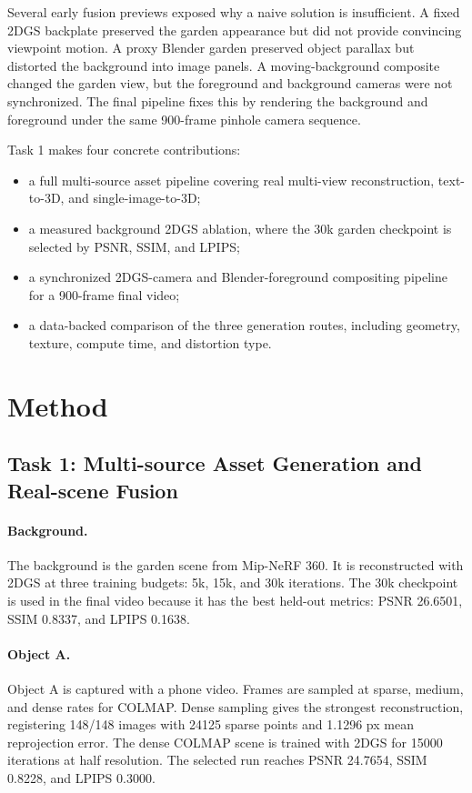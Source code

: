 \documentclass[10pt,twocolumn,letterpaper]{article}
\begin{document}
Several early fusion previews exposed why a naive solution is insufficient.
A fixed 2DGS backplate preserved the garden appearance but did not provide convincing viewpoint motion.
A proxy Blender garden preserved object parallax but distorted the background into image panels.
A moving-background composite changed the garden view, but the foreground and background cameras were not synchronized.
The final pipeline fixes this by rendering the background and foreground under the same 900-frame pinhole camera sequence.

Task 1 makes four concrete contributions:
\begin{itemize}[leftmargin=*,noitemsep]
    \item a full multi-source asset pipeline covering real multi-view reconstruction, text-to-3D, and single-image-to-3D;
    \item a measured background 2DGS ablation, where the 30k garden checkpoint is selected by PSNR, SSIM, and LPIPS;
    \item a synchronized 2DGS-camera and Blender-foreground compositing pipeline for a 900-frame final video;
    \item a data-backed comparison of the three generation routes, including geometry, texture, compute time, and distortion type.
\end{itemize}

\section{Method}

\subsection{Task 1: Multi-source Asset Generation and Real-scene Fusion}
\paragraph{Background.}
The background is the garden scene from Mip-NeRF 360.
It is reconstructed with 2DGS at three training budgets: 5k, 15k, and 30k iterations.
The 30k checkpoint is used in the final video because it has the best held-out metrics: PSNR 26.6501, SSIM 0.8337, and LPIPS 0.1638.

\paragraph{Object A.}
Object A is captured with a phone video.
Frames are sampled at sparse, medium, and dense rates for COLMAP.
Dense sampling gives the strongest reconstruction, registering 148/148 images with 24125 sparse points and 1.1296 px mean reprojection error.
The dense COLMAP scene is trained with 2DGS for 15000 iterations at half resolution.
The selected run reaches PSNR 24.7654, SSIM 0.8228, and LPIPS 0.3000.
\end{document}

